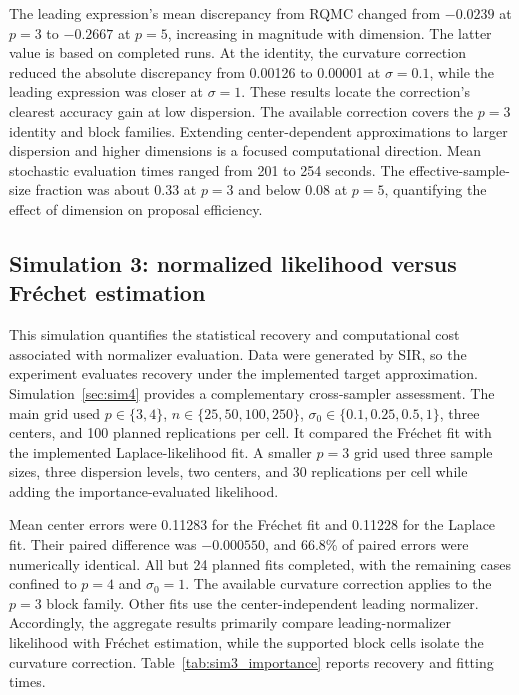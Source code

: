 \documentclass[
  12pt]{article}
\begin{document}
The leading expression's mean discrepancy from RQMC changed from $-0.0239$ at $p=3$ to $-0.2667$ at $p=5$, increasing in magnitude with dimension. The latter value is based on completed runs. At the identity, the curvature correction reduced the absolute discrepancy from 0.00126 to 0.00001 at $\sigma=0.1$, while the leading expression was closer at $\sigma=1$. These results locate the correction's clearest accuracy gain at low dispersion. The available correction covers the $p=3$ identity and block families. Extending center-dependent approximations to larger dispersion and higher dimensions is a focused computational direction. Mean stochastic evaluation times ranged from 201 to 254 seconds. The effective-sample-size fraction was about 0.33 at $p=3$ and below 0.08 at $p=5$, quantifying the effect of dimension on proposal efficiency. 



\subsection{Simulation 3: normalized likelihood versus Fr\'echet estimation}\label{sec:sim3}

This simulation quantifies the statistical recovery and computational cost associated with normalizer evaluation. Data were generated by SIR, so the experiment evaluates recovery under the implemented target approximation. Simulation~\ref{sec:sim4} provides a complementary cross-sampler assessment. The main grid used $p\in\{3,4\}$, $n\in\{25,50,100,250\}$, $\sigma_0\in\{0.1,0.25,0.5,1\}$, three centers, and 100 planned replications per cell. It compared the Fr\'echet fit with the implemented Laplace-likelihood fit. A smaller $p=3$ grid used three sample sizes, three dispersion levels, two centers, and 30 replications per cell while adding the importance-evaluated likelihood.

Mean center errors were 0.11283 for the Fr\'echet fit and 0.11228 for the Laplace fit. Their paired difference was $-0.000550$, and 66.8\% of paired errors were numerically identical. All but 24 planned fits completed, with the remaining cases confined to $p=4$ and $\sigma_0=1$. The available curvature correction applies to the $p=3$ block family. Other fits use the center-independent leading normalizer. Accordingly, the aggregate results primarily compare leading-normalizer likelihood with Fr\'echet estimation, while the supported block cells isolate the curvature correction. Table~\ref{tab:sim3_importance} reports recovery and fitting times.
\end{document}
